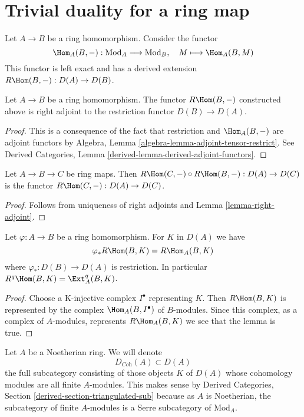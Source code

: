 \section{Trivial duality for a ring map}
\label{section-trivial}

\noindent
Let $A \to B$ be a ring homomorphism. Consider the functor
$$
\Hom_A(B, -) : \text{Mod}_A \longrightarrow \text{Mod}_B,\quad
M \longmapsto \Hom_A(B, M)
$$
This functor is left exact and has a derived extension
$R\Hom(B, -) : D(A) \to D(B)$.

\begin{lemma}
\label{lemma-right-adjoint}
Let $A \to B$ be a ring homomorphism. The functor $R\Hom(B, -)$
constructed above is right adjoint to the restriction functor
$D(B) \to D(A)$.
\end{lemma}

\begin{proof}
This is a consequence of the fact that restriction and $\Hom_A(B, -)$ are
adjoint functors by Algebra, Lemma \ref{algebra-lemma-adjoint-tensor-restrict}.
See Derived Categories, Lemma \ref{derived-lemma-derived-adjoint-functors}.
\end{proof}

\begin{lemma}
\label{lemma-composition-right-adjoints}
Let $A \to B \to C$ be ring maps. Then
$R\Hom(C, -) \circ R\Hom(B, -) : D(A) \to D(C)$
is the functor $R\Hom(C, -) : D(A) \to D(C)$.
\end{lemma}

\begin{proof}
Follows from uniqueness of right adjoints and Lemma \ref{lemma-right-adjoint}.
\end{proof}

\begin{lemma}
\label{lemma-RHom-ext}
Let $\varphi : A \to B$ be a ring homomorphism. For $K$ in $D(A)$ we have
$$
\varphi_*R\Hom(B, K) = R\Hom_A(B, K)
$$
where $\varphi_* : D(B) \to D(A)$ is restriction. In particular
$R^q\Hom(B, K) = \Ext_A^q(B, K)$.
\end{lemma}

\begin{proof}
Choose a K-injective complex $I^\bullet$ representing $K$.
Then $R\Hom(B, K)$ is represented by the complex $\Hom_A(B, I^\bullet)$
of $B$-modules. Since this complex, as a complex of $A$-modules,
represents $R\Hom_A(B, K)$ we see that the lemma is true.
\end{proof}

\noindent
Let $A$ be a Noetherian ring. We will denote
$$
D_{\textit{Coh}}(A) \subset D(A)
$$
the full subcategory consisting of those objects $K$ of $D(A)$
whose cohomology modules are all finite $A$-modules. This makes sense
by Derived Categories, Section \ref{derived-section-triangulated-sub}
because as $A$ is Noetherian, the subcategory of finite $A$-modules
is a Serre subcategory of $\text{Mod}_A$.

